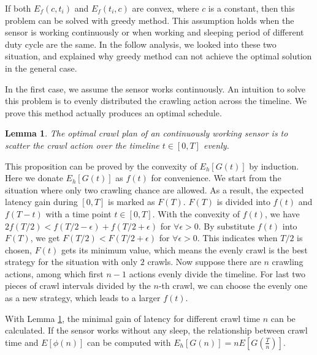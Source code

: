 \documentclass[conference]{IEEEtran}
\newtheorem{lemma}{Lemma}
\begin{document}
If both $E_f(c, t_i)$ and $E_f(t_i,c)$ are convex, where $c$ is a constant, then this problem can be solved with greedy method. 
This assumption holds when the sensor is working continuously or when working and sleeping period of different duty cycle are the same.
In the follow analysis, we looked into these two situation, and explained why greedy method can not achieve the optimal solution in the general case.

In the first case, we assume the sensor works continuously.
An intuition to solve this problem is to evenly distributed the crawling action across the timeline. 
We prove this method actually produces an optimal schedule.
\begin{lemma}
\label{evenly}
The optimal crawl plan of an continuously working sensor is to scatter the crawl action over the timeline $t\in [0, T]$ evenly.
\end{lemma}
\begin{IEEEproof}
This proposition can be proved by the convexity of $E_h[G(t)]$ \cite{boyd2004convex} by induction. 
Here we donate $E_h[G(t)]$ as $f(t)$ for convenience.
We start from the situation where only two crawling chance are allowed. 
As a result, the expected latency gain during $[0,T]$ is marked as $F(T)$.
$F(T)$ is divided into $f(t)$ and $f(T-t)$ with a time point $t\in[0,T]$. 
With the convexity of $f(t)$, we have $2f(T/2)<f(T/2-\epsilon)+f(T/2+\epsilon)$ for $\forall{\epsilon>0}$. 
By substitute $f(t)$ into $F(T)$, we get $F(T/2)<F(T/2+\epsilon)$ for $\forall{\epsilon>0}$.
This indicates when $T/2$ is chosen, $F(t)$ gets its minimum value, which means the evenly crawl is the best strategy for the situation with only $2$ crawls.
Now suppose there are $n$ crawling actions, among which first $n-1$ actions evenly divide the timeline.
For last two pieces of crawl intervals divided by the $n$-th crawl, we can choose the evenly one as a new strategy, which leads to a larger $f(t)$.
\end{IEEEproof}

With Lemma \ref{evenly}, the minimal gain of latency for different crawl time $n$ can be calculated.
If the sensor works without any sleep, the relationship between crawl time and $E[\phi(n)]$ can be computed with $E_h[G(n)]=nE[G(\frac{T}{n})]$.
\end{document}
